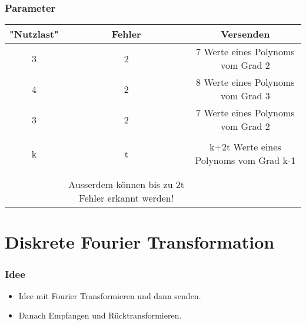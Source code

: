 \documentclass[11pt,aspectratio=169]{beamer}
\begin{document}
	\begin{frame}
	\frametitle{Parameter}
	\begin{center}
		\begin{tabular}{ c c c } 
			\hline
			"Nutzlast" & Fehler & Versenden \\
			\hline 
			3 & 2 & 7 Werte eines Polynoms vom Grad 2 \\ 
			4 & 2 & 8 Werte eines Polynoms vom Grad 3 \\ 
			3 & 2 & 7 Werte eines Polynoms vom Grad 2 \\ 
			&&\\
			k & t & k+2t Werte eines Polynoms vom Grad k-1 \\ 
			\hline
			&&\\
			&&\\
			&Ausserdem können bis zu 2t Fehler erkannt werden!\\
		\end{tabular}
	\end{center}

	
		
	\end{frame}
\section{Diskrete Fourier Transformation}
	\begin{frame}
		\frametitle{Idee}
		\begin{itemize}
			\item Idee mit Fourier Transformieren und dann senden.
			\item Danach Empfangen und Rücktransformieren.
		\end{itemize}
	\end{frame}

	\begin{frame}
		\begin{figure}
	\end{figure}
	\end{frame}
	
\end{document}
